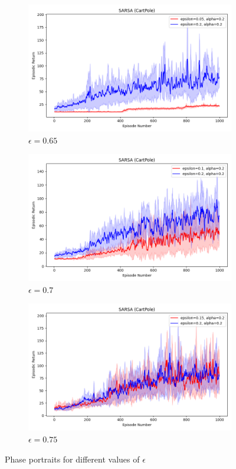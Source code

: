 \documentclass[11pt, a4]{article}
\begin{document}
\begin{figure}[h]
				\vspace{0.1cm}
				
				\begin{subfigure}[h]{0.3\textwidth}
					\centering
					\includegraphics[width=\textwidth]{../plots/sarsa_0.2_0.05vs0.2_0.2.png}
					\caption{$\epsilon = 0.65$}
				\end{subfigure}
				\hfill
				\begin{subfigure}[h]{0.3\textwidth}
					\centering
					\includegraphics[width=\textwidth]{../plots/sarsa_0.2_0.1vs0.2_0.2.png}
					\caption{$\epsilon = 0.7$}
				\end{subfigure}
				\hfill
				\begin{subfigure}[h]{0.3\textwidth}
					\centering
					\includegraphics[width=\textwidth]{../plots/sarsa_0.2_0.15vs0.2_0.2.png}
					\caption{$\epsilon = 0.75$}
				\end{subfigure}
				
				\caption{Phase portraits for different values of $\epsilon$}
				\label{fig:phase_portraits}
			\end{figure}
\end{document}
